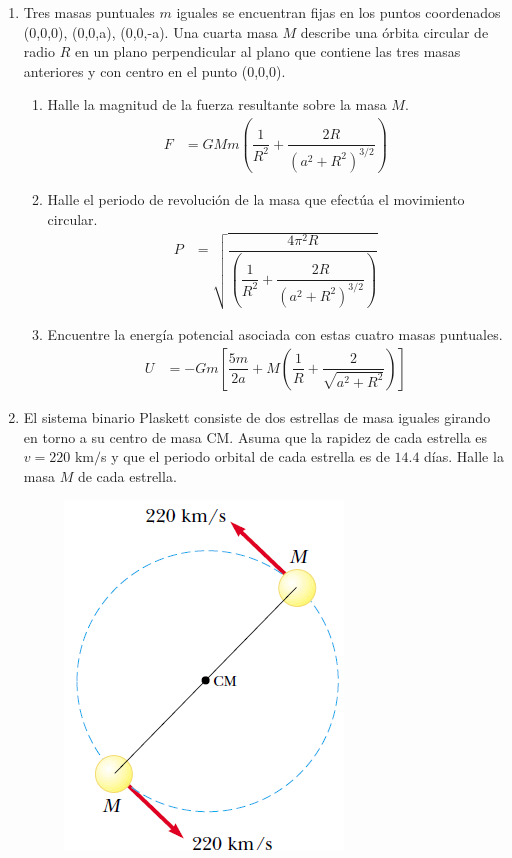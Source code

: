\documentclass[11pt,twocolumn]{article}
\begin{document}
\begin{enumerate}
\item Tres masas puntuales $m$ iguales se encuentran fijas en los puntos coordenados (0,0,0), (0,0,a), (0,0,-a). Una cuarta masa $M$ describe una órbita circular de radio $R$ en un plano perpendicular al plano que contiene las tres masas anteriores y con centro en el punto (0,0,0).
\begin{enumerate}
\item Halle la magnitud de la fuerza resultante sobre la masa $M$.
\begin{align*}
F&=GMm\left(\dfrac{1}{R^2}+\dfrac{2R}{(a^2+R^2)^{3/2}}\right)
\end{align*}
\item Halle el periodo de revolución de la masa que efectúa el movimiento circular.
\begin{align*}
P&=\sqrt{\dfrac{4\pi^2R}{\left(\dfrac{1}{R^2}+\dfrac{2R}{(a^2+R^2)^{3/2}}\right)}}
\end{align*}
\item Encuentre la energía potencial asociada con estas cuatro masas puntuales.
\begin{align*}
U&=-Gm\left[\dfrac{5m}{2a}+M\left(\dfrac{1}{R}+\dfrac{2}{\sqrt{a^2+R^2}}\right)\right]
\end{align*}
\end{enumerate}




\item El sistema binario Plaskett consiste de dos estrellas de masa iguales girando en torno a su centro de masa CM. Asuma que la rapidez de cada estrella es $v=220$ km$/$s y que el periodo orbital de cada estrella es de $14.4$ días. Halle la masa $M$ de cada estrella.
\begin{figure}[h]
\centering
\includegraphics[scale=0.5]{fig3}
\end{figure}



\end{enumerate}
\end{document}
